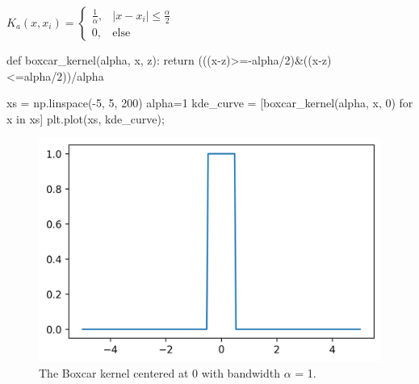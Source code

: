 \documentclass[
  letterpaper,
  DIV=11,
  numbers=noendperiod]{scrreprt}
\newenvironment{Shaded}{\begin{snugshade}}{\end{snugshade}}
\newcommand{\ControlFlowTok}[1]{\textcolor[rgb]{0.00,0.23,0.31}{#1}}
\newcommand{\DecValTok}[1]{\textcolor[rgb]{0.68,0.00,0.00}{#1}}
\newcommand{\KeywordTok}[1]{\textcolor[rgb]{0.00,0.23,0.31}{#1}}
\newcommand{\NormalTok}[1]{\textcolor[rgb]{0.00,0.23,0.31}{#1}}
\newcommand{\OperatorTok}[1]{\textcolor[rgb]{0.37,0.37,0.37}{#1}}
\begin{document}
\(K_a(x, x_i) = \begin{cases}  \frac{1}{\alpha}, & |x - x_i| \le \frac{\alpha}{2}\\  0, & \text{else }  \end{cases}\)

\begin{Shaded}
\begin{Highlighting}[]
\KeywordTok{def}\NormalTok{ boxcar\_kernel(alpha, x, z):}
    \ControlFlowTok{return}\NormalTok{ (((x}\OperatorTok{{-}}\NormalTok{z)}\OperatorTok{\textgreater{}={-}}\NormalTok{alpha}\OperatorTok{/}\DecValTok{2}\NormalTok{)}\OperatorTok{\&}\NormalTok{((x}\OperatorTok{{-}}\NormalTok{z)}\OperatorTok{\textless{}=}\NormalTok{alpha}\OperatorTok{/}\DecValTok{2}\NormalTok{))}\OperatorTok{/}\NormalTok{alpha}

\NormalTok{xs }\OperatorTok{=}\NormalTok{ np.linspace(}\OperatorTok{{-}}\DecValTok{5}\NormalTok{, }\DecValTok{5}\NormalTok{, }\DecValTok{200}\NormalTok{)}
\NormalTok{alpha}\OperatorTok{=}\DecValTok{1}
\NormalTok{kde\_curve }\OperatorTok{=}\NormalTok{ [boxcar\_kernel(alpha, x, }\DecValTok{0}\NormalTok{) }\ControlFlowTok{for}\NormalTok{ x }\KeywordTok{in}\NormalTok{ xs]}
\NormalTok{plt.plot(xs, kde\_curve)}\OperatorTok{;}
\end{Highlighting}
\end{Shaded}

\begin{figure}[H]

{\centering \includegraphics{visualization_2/visualization_2_files/figure-pdf/cell-6-output-1.png}

}

\caption{The Boxcar kernel centered at 0 with bandwidth \(\alpha\) = 1.}

\end{figure}
\end{document}
